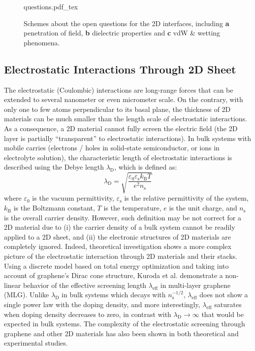 \begin{figure}[h]
  \centering
  {questions.pdf_tex}
  \caption{\label{fig:intro-questions}%
    Schemes about the open questions for the 2D interfaces, including
    \textbf{a} penetration of field, \textbf{b} dielectric properties
    and \textbf{c} vdW \& wetting phenomena. }
\end{figure}


\subsection{Electrostatic Interactions Through 2D Sheet}
\label{sec:electr-inter-thro}

The electrostatic (Coulombic) interactions are long-range forces that
can be extended to several nano\-meter or even micro\-meter scale.
%
On the contrary, with only one to few atoms perpendicular to its basal
plane, the thickness of 2D materials can be much smaller than the
length scale of electrostatic interactions.
%
As a consequence, a 2D material cannot fully screen the electric field
(\ie the 2D layer is partially ``transparent'' to electrostatic
interactions).
%
In bulk systems with mobile carries (electrons / holes in solid-state
semiconductor, or ions in electrolyte solution), the characteristic
length of electrostatic interactions is described using the Debye
length $\lambda_{\mathrm{D}}$, which is defined as:
\begin{equation}
  \label{eq:intro-debye}
  \lambda_{\mathrm{D}} = {\displaystyle \sqrt{
      \frac{\varepsilon_{0} \varepsilon_{\mathrm{s}} k_{\mathrm{B}} T}
      {e^{2} n_{\mathrm{s}}}
    }}
\end{equation}
where $\varepsilon_{0}$ is the vacuum permittivity,
$\varepsilon_{\mathrm{s}}$ is the relative permittivity of the system,
$k_{\mathrm{B}}$ is the Boltzmann constant, $T$ is the temperature,
$e$ is the unit charge, and $n_{\mathrm{s}}$ is the overall carrier
density.
%
However, such definition may be not correct for a 2D material due to
(i) the carrier density of a bulk system cannot be readily applied to
a 2D sheet, and (ii) the electronic structures of 2D materials are
completely ignored.
%
Indeed, theoretical investigation shows a more complex picture of the
electrostatic interaction through 2D materials and their stacks.
%
Using a discrete model based on total energy optimization and taking
into account of graphene's Dirac cone structure, Kuroda et
al. demonstrate a non-linear behavior of the effective screening
length $\lambda_{\mathrm{eff}}$ in multi-layer graphene
(MLG). 
%
Unlike $\lambda_{\mathrm{D}}$ in bulk systems which decays with
$n_{\mathrm{s}}^{-1/2}$, $\lambda_{\mathrm{eff}}$ does not show a
single power law with the doping density, and more interestingly,
$\lambda_{\mathrm{eff}}$ saturates when doping density decreases to
zero, in contrast with $\lambda_{\mathrm{D}} \to \infty$ that would be
expected in bulk systems.
%
The complexity of the electrostatic screening through graphene and
other 2D materials has also been shown in both theoretical and
experimental studies.  
%

